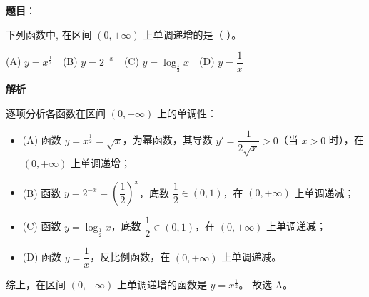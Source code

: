 \begin{answer}

\textbf{题目}：

下列函数中, 在区间 $(0, +\infty)$ 上单调递增的是（ ）。

(A) $y = x^{\frac{1}{2}}$　(B) $y = 2^{-x}$　(C) $y = \log_{\frac{1}{2}} x$　(D) $y = \dfrac{1}{x}$

\textbf{解析}

逐项分析各函数在区间 $(0, +\infty)$ 上的单调性：
\begin{itemize}
\item (A) 函数 $y = x^{\frac{1}{2}} = \sqrt{x}$，为幂函数，其导数 $y' = \dfrac{1}{2\sqrt{x}} > 0$（当 $x > 0$ 时），在 $(0, +\infty)$ 上单调递增；
\item (B) 函数 $y = 2^{-x} = \left(\dfrac{1}{2}\right)^x$，底数 $\dfrac{1}{2} \in (0, 1)$，在 $(0, +\infty)$ 上单调递减；
\item (C) 函数 $y = \log_{\frac{1}{2}} x$，底数 $\dfrac{1}{2} \in (0, 1)$，在 $(0, +\infty)$ 上单调递减；
\item (D) 函数 $y = \dfrac{1}{x}$，反比例函数，在 $(0, +\infty)$ 上单调递减。
\end{itemize}
综上，在区间 $(0, +\infty)$ 上单调递增的函数是 $y = x^{\frac{1}{2}}$。
故选 A。


\end{answer}
